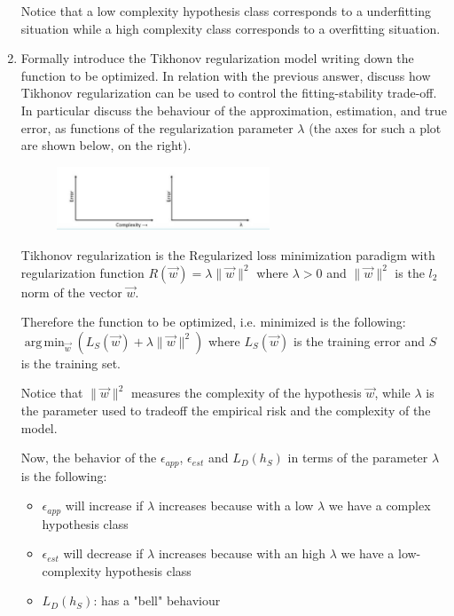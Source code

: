 \documentclass[a4paper,11pt,oneside]{book}
\DeclareMathOperator*{\argmin}{arg\,min}
\begin{document}
\begin{enumerate}
\begin{solution}
        Notice that a low complexity hypothesis class corresponds to a underfitting situation while a high complexity class corresponds to a overfitting situation.
    \end{solution}
    
\item Formally introduce the Tikhonov regularization model writing down the function to be optimized. In relation with the previous answer, discuss how Tikhonov regularization can be used to control the fitting-stability trade-off. In particular discuss the behaviour of the approximation, estimation, and true error, as functions of the regularization parameter $\lambda$ (the axes for such a plot are shown below, on the right).
\begin{figure}[H]
    \centering
    \includegraphics[width=0.6\textwidth,height=0.6\textheight,keepaspectratio]{images/3_Jul_2021.png}
 \end{figure}
    \begin{solution}
        Tikhonov regularization is the Regularized loss minimization paradigm with regularization function $R(\vec{w}) = \lambda\|\vec{w}\|^2$ where $\lambda > 0$ and $\|\vec{w}\|^2$ is the $l_2$ norm of the vector $\vec{w}$.
        
        Therefore the function to be optimized, i.e. minimized is the following: $\argmin_{\vec{w}}(L_S(\vec{w}) + \lambda\|\vec{w}\|^2)$ where $L_S(\vec{w})$ is the training error and $S$ is the training set.
        
        Notice that $\|\vec{w}\|^2$ measures the complexity of the hypothesis $\vec{w}$, while $\lambda$ is the parameter used to tradeoff the empirical risk and the complexity of the model.
        
        Now, the behavior of the $\epsilon_{app}$, $\epsilon_{est}$ and $L_D(h_S)$ in terms of the parameter $\lambda$ is the following:
        \begin{itemize}
        \item $\epsilon_{app}$ will increase if $\lambda$ increases because with a low $\lambda$ we have a complex hypothesis class
        \item $\epsilon_{est}$ will decrease if $\lambda$ increases because with an high $\lambda$ we have a low-complexity hypothesis class
        \item $L_D(h_S)$: has a "bell" behaviour
        \end{itemize}
        

\end{solution}
\end{enumerate}
\end{document}
